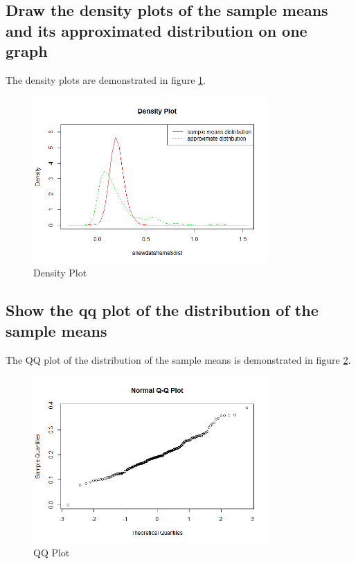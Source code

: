 \documentclass[12pt]{article}
\begin{document}
\subsection{Draw the density plots of the sample means and its approximated distribution on one graph}
The density plots are demonstrated in figure \ref{density plots}.
\begin{figure}[!ht]
	\centering
	\includegraphics[width=0.8\textwidth]{Rplot01.png}
	\caption{Density Plot}
	\label{density plots}
\end{figure}


\subsection{Show the qq plot of the distribution of the sample means}
	The QQ plot of the distribution of the sample means is demonstrated in figure \ref{QQ plot}.
\begin{figure}[!ht]
	\centering
	\includegraphics[width=0.8\textwidth]{Rplot02.png}
	\caption{QQ Plot}
	\label{QQ plot}
\end{figure}
\end{document}
